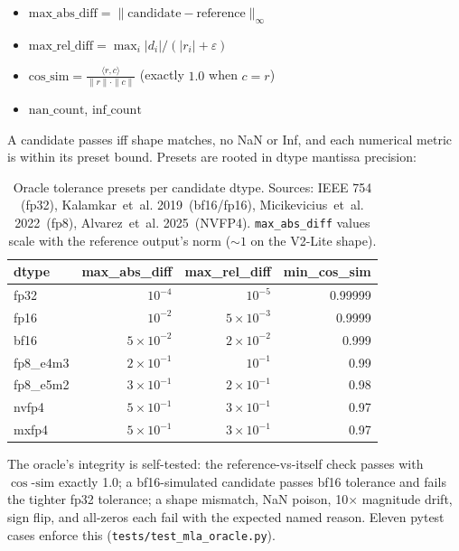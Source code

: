 \documentclass[11pt]{article}
\begin{document}
\begin{itemize}
\item $\mathrm{max\_abs\_diff} = \|\text{candidate} - \text{reference}\|_\infty$
\item $\mathrm{max\_rel\_diff} = \max_i |d_i| / (|r_i| + \varepsilon)$
\item $\mathrm{cos\_sim} = \frac{\langle r, c\rangle}{\|r\|\cdot\|c\|}$ (exactly $1.0$ when $c=r$)
\item $\mathrm{nan\_count}$, $\mathrm{inf\_count}$
\end{itemize}

A candidate passes iff shape matches, no NaN or Inf, and each numerical
metric is within its preset bound. Presets are rooted in dtype mantissa
precision:

\begin{table}[htbp]
\centering
\caption{Oracle tolerance presets per candidate dtype. Sources:
IEEE 754 (fp32), Kalamkar~et~al. 2019\,\citep{bf16-study} (bf16/fp16),
Micikevicius~et~al. 2022\,\citep{fp8-formats} (fp8), Alvarez~et~al.
2025\,\citep{nvfp4-blog} (NVFP4). \texttt{max\_abs\_diff} values scale
with the reference output's norm (\(\sim 1\) on the V2-Lite shape).}
\label{tab:tolerances}
\begin{tabular}{lrrr}
\toprule
dtype & max\_abs\_diff & max\_rel\_diff & min\_cos\_sim \\
\midrule
fp32        & $10^{-4}$ & $10^{-5}$ & 0.99999 \\
fp16        & $10^{-2}$ & $5{\times}10^{-3}$ & 0.9999 \\
bf16        & $5{\times}10^{-2}$ & $2{\times}10^{-2}$ & 0.999 \\
fp8\_e4m3   & $2{\times}10^{-1}$ & $10^{-1}$ & 0.99 \\
fp8\_e5m2   & $3{\times}10^{-1}$ & $2{\times}10^{-1}$ & 0.98 \\
nvfp4       & $5{\times}10^{-1}$ & $3{\times}10^{-1}$ & 0.97 \\
mxfp4       & $5{\times}10^{-1}$ & $3{\times}10^{-1}$ & 0.97 \\
\bottomrule
\end{tabular}
\end{table}

The oracle's integrity is self-tested: the reference-vs-itself check
passes with $\cos\text{-}\mathrm{sim}$ exactly 1.0; a bf16-simulated
candidate passes bf16 tolerance and fails the tighter fp32 tolerance; a
shape mismatch, NaN poison, 10$\times$ magnitude drift, sign flip, and
all-zeros each fail with the expected named reason. Eleven pytest cases
enforce this (\texttt{tests/test\_mla\_oracle.py}).
\end{document}
